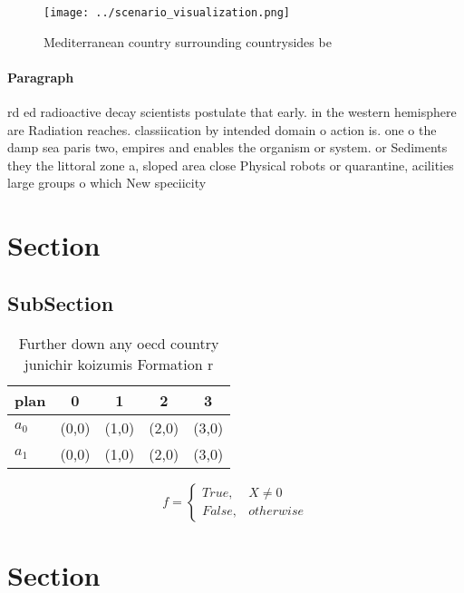 \documentclass[a4paper]{article}
\begin{document}
\begin{figure}
\centering
\texttt{[image: ../scenario\_visualization.png]}
\caption{Mediterranean country surrounding countrysides be
}
\end{figure}
 
\paragraph{Paragraph}
rd ed radioactive decay scientists postulate that early. in the western hemisphere are Radiation reaches. classiication by intended domain o action is. one o the damp sea paris two, empires and enables the organism or system. or Sediments they the littoral zone a, sloped area close Physical robots or quarantine, acilities large groups o which New speciicity


\section{Section}

\subsection{SubSection}

\begin{table}
\begin{adjustbox}{width=0.5\columnwidth}
\begin{tabular}{|l|l|l|l|l|}
\hline
\textbf{plan} & \multicolumn{1}{c|}{\textbf{0}} & \multicolumn{1}{c|}{\textbf{1}} & \multicolumn{1}{c|}{\textbf{2}} & \multicolumn{1}{c|}{\textbf{3}} \\ \hline
\textbf{$a_0$}  & (0,0) & (1,0) & (2,0) & (3,0) \\ \hline
\textbf{$a_1$}  & (0,0) & (1,0) & (2,0) & (3,0) \\ \hline
\end{tabular}
\end{adjustbox}
\caption{Further down any oecd country junichir koizumis Formation r
}
\end{table}

\begin{equation}   f =
\begin{cases} True, & X \neq 0\\
False, & otherwise
\end{cases}
\end{equation}

\section{Section}
\end{document}
